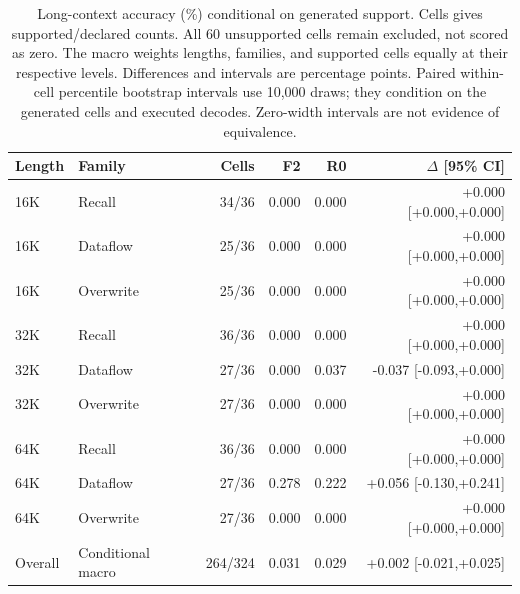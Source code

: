 \begin{table}[t]
\centering\small
\begin{tabular}{@{}llrrrr@{}}
\toprule
Length & Family & Cells & F2 & R0 & $\Delta$ [95\% CI]\\
\midrule
16K & Recall & 34/36 & 0.000 & 0.000 & +0.000 [+0.000,+0.000]\\
16K & Dataflow & 25/36 & 0.000 & 0.000 & +0.000 [+0.000,+0.000]\\
16K & Overwrite & 25/36 & 0.000 & 0.000 & +0.000 [+0.000,+0.000]\\
32K & Recall & 36/36 & 0.000 & 0.000 & +0.000 [+0.000,+0.000]\\
32K & Dataflow & 27/36 & 0.000 & 0.037 & -0.037 [-0.093,+0.000]\\
32K & Overwrite & 27/36 & 0.000 & 0.000 & +0.000 [+0.000,+0.000]\\
64K & Recall & 36/36 & 0.000 & 0.000 & +0.000 [+0.000,+0.000]\\
64K & Dataflow & 27/36 & 0.278 & 0.222 & +0.056 [-0.130,+0.241]\\
64K & Overwrite & 27/36 & 0.000 & 0.000 & +0.000 [+0.000,+0.000]\\
\midrule
Overall & Conditional macro & 264/324 & 0.031 & 0.029 & +0.002 [-0.021,+0.025]\\
\bottomrule
\end{tabular}
\caption{Long-context accuracy (\%) conditional on generated support. Cells gives supported/declared counts. All 60 unsupported cells remain excluded, not scored as zero. The macro weights lengths, families, and supported cells equally at their respective levels. Differences and intervals are percentage points. Paired within-cell percentile bootstrap intervals use 10,000 draws; they condition on the generated cells and executed decodes. Zero-width intervals are not evidence of equivalence.}
\label{tab:e3-confirmation-conditional}
\end{table}
